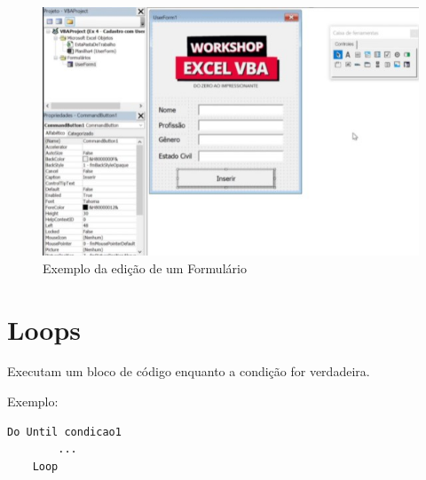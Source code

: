 \documentclass[12pt, a4paper]{article}
\begin{document}
\newpage
\begin{figure}[h]
    \centering
    \includegraphics[scale = 0.75]{Screenshot_2.jpg}
    \caption{Exemplo da edição de um Formulário}
\end{figure}
    
\section{Loops}
    Executam um bloco de código enquanto a condição for verdadeira.

    Exemplo:

\begin{lstlisting}[language = VBScript]
    Do Until condicao1
        ...
    Loop
\end{lstlisting}
\end{document}
